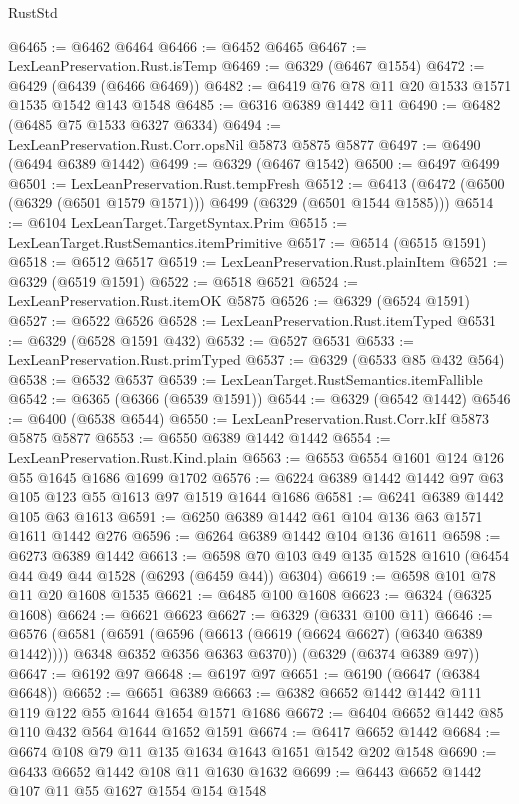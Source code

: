 \begin{lexlean}{RustStd}
\begin{coremodule}
{\begin{coremodule}
{{{{{{{{{{{{{{{{{{{{{{{{{{{{{{{{{{{@6465 := @6462 @6464
@6466 := @6452 @6465
@6467 := LexLeanPreservation.Rust.isTemp
@6469 := @6329 (@6467 @1554)
@6472 := @6429 (@6439 (@6466 @6469))
@6482 := @6419 @76 @78 @11 @20 @1533 @1571 @1535 @1542 @143 @1548
@6485 := @6316 @6389 @1442 @11
@6490 := @6482 (@6485 @75 @1533 @6327 @6334)
@6494 := LexLeanPreservation.Rust.Corr.opsNil @5873 @5875 @5877
@6497 := @6490 (@6494 @6389 @1442)
@6499 := @6329 (@6467 @1542)
@6500 := @6497 @6499
@6501 := LexLeanPreservation.Rust.tempFresh
@6512 := @6413 (@6472 (@6500 (@6329 (@6501 @1579 @1571))) @6499 (@6329 (@6501 @1544 @1585)))
@6514 := @6104 LexLeanTarget.TargetSyntax.Prim
@6515 := LexLeanTarget.RustSemantics.itemPrimitive
@6517 := @6514 (@6515 @1591)
@6518 := @6512 @6517
@6519 := LexLeanPreservation.Rust.plainItem
@6521 := @6329 (@6519 @1591)
@6522 := @6518 @6521
@6524 := LexLeanPreservation.Rust.itemOK @5875
@6526 := @6329 (@6524 @1591)
@6527 := @6522 @6526
@6528 := LexLeanPreservation.Rust.itemTyped
@6531 := @6329 (@6528 @1591 @432)
@6532 := @6527 @6531
@6533 := LexLeanPreservation.Rust.primTyped
@6537 := @6329 (@6533 @85 @432 @564)
@6538 := @6532 @6537
@6539 := LexLeanTarget.RustSemantics.itemFallible
@6542 := @6365 (@6366 (@6539 @1591))
@6544 := @6329 (@6542 @1442)
@6546 := @6400 (@6538 @6544)
@6550 := LexLeanPreservation.Rust.Corr.kIf @5873 @5875 @5877
@6553 := @6550 @6389 @1442 @1442
@6554 := LexLeanPreservation.Rust.Kind.plain
@6563 := @6553 @6554 @1601 @124 @126 @55 @1645 @1686 @1699 @1702
@6576 := @6224 @6389 @1442 @1442 @97 @63 @105 @123 @55 @1613 @97 @1519 @1644 @1686
@6581 := @6241 @6389 @1442 @105 @63 @1613
@6591 := @6250 @6389 @1442 @61 @104 @136 @63 @1571 @1611 @1442 @276
@6596 := @6264 @6389 @1442 @104 @136 @1611
@6598 := @6273 @6389 @1442
@6613 := @6598 @70 @103 @49 @135 @1528 @1610 (@6454 @44 @49 @44 @1528 (@6293 (@6459 @44)) @6304)
@6619 := @6598 @101 @78 @11 @20 @1608 @1535
@6621 := @6485 @100 @1608
@6623 := @6324 (@6325 @1608)
@6624 := @6621 @6623
@6627 := @6329 (@6331 @100 @11)
@6646 := @6576
    (@6581
      (@6591
        (@6596 (@6613 (@6619 (@6624 @6627) (@6340 @6389 @1442))))
        @6348
        @6352
        @6356
        @6363
        @6370))
    (@6329 (@6374 @6389 @97))
@6647 := @6192 @97
@6648 := @6197 @97
@6651 := @6190 (@6647 (@6384 @6648))
@6652 := @6651 @6389
@6663 := @6382 @6652 @1442 @1442 @111 @119 @122 @55 @1644 @1654 @1571 @1686
@6672 := @6404 @6652 @1442 @85 @110 @432 @564 @1644 @1652 @1591
@6674 := @6417 @6652 @1442
@6684 := @6674 @108 @79 @11 @135 @1634 @1643 @1651 @1542 @202 @1548
@6690 := @6433 @6652 @1442 @108 @11 @1630 @1632
@6699 := @6443 @6652 @1442 @107 @11 @55 @1627 @1554 @154 @1548
}}}}}}}}}}}}}}}}}}}}}}}}}}}}}}}}}}}
\end{coremodule}}
\end{coremodule}
\end{lexlean}
